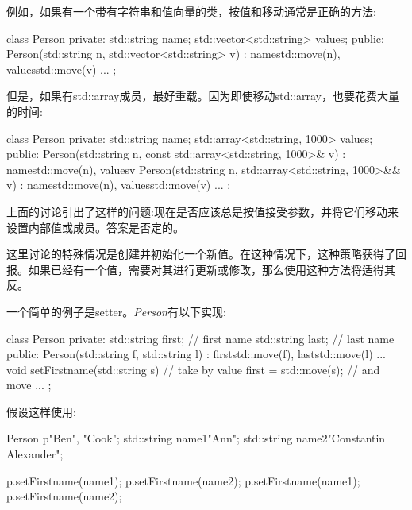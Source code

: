 例如，如果有一个带有字符串和值向量的类，按值和移动通常是正确的方法:\par

\begin{codebox}[cpp]
class Person {
private:
  std::string name;
  std::vector<std::string> values;
public:
  Person(std::string n, std::vector<std::string> v)
  : name{std::move(n)}, values{std::move(v)} {
  }
  ...
};
\end{codebox}

但是，如果有std::array成员，最好重载。因为即使移动std::array，也要花费大量的时间:\par

\begin{codebox}[cpp]
class Person {
private:
  std::string name;
  std::array<std::string, 1000> values;
public:
  Person(std::string n, const std::array<std::string, 1000>& v)
  : name{std::move(n)}, values{v} {
  }
  Person(std::string n, std::array<std::string, 1000>&& v)
  : name{std::move(n)}, values{std::move(v)} {
  }
  ...
};
\end{codebox}


上面的讨论引出了这样的问题:现在是否应该总是按值接受参数，并将它们移动来设置内部值或成员。答案是否定的。\par

这里讨论的特殊情况是创建并初始化一个新值。在这种情况下，这种策略获得了回报。如果已经有一个值，需要对其进行更新或修改，那么使用这种方法将适得其反。\par

一个简单的例子是setter。\textit{Person}有以下实现:\par

\begin{codebox}[cpp]
class Person {
private:
  std::string first; // first name
  std::string last; // last name
public:
  Person(std::string f, std::string l)
  : first{std::move(f)}, last{std::move(l)} {
  }
  ...
  void setFirstname(std::string s) { // take by value
    first = std::move(s); // and move
  }
  ...
};
\end{codebox}

假设这样使用:\par

\begin{codebox}[cpp]
Person p{"Ben", "Cook"};
std::string name1{"Ann"};
std::string name2{"Constantin Alexander"};

p.setFirstname(name1);
p.setFirstname(name2);
p.setFirstname(name1);
p.setFirstname(name2);
\end{codebox}

